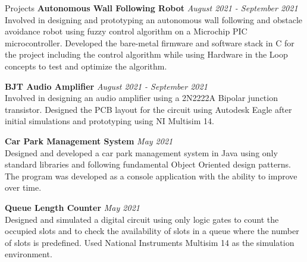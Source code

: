 \documentclass[
	11pt, %
]{./../assets/resume} %
\begin{document}
\begin{rSection}{Projects}
{\bf Autonomous Wall Following Robot} \hfill {\em August 2021 - September 2021} \\
Involved in designing and prototyping an autonomous wall following and obstacle avoidance robot using fuzzy control algorithm on a Microchip PIC microcontroller. Developed the bare-metal firmware and software stack in C for the project including the control algorithm while using Hardware in the Loop concepts to test and optimize the algorithm.
    
{\bf BJT Audio Amplifier} \hfill {\em August 2021 - September 2021} \\
Involved in designing an audio amplifier using a 2N2222A Bipolar junction transistor. Designed the PCB layout for the circuit using Autodesk Eagle after initial simulations and prototyping using NI Multisim 14.
    
{\bf Car Park Management System} \hfill {\em May 2021} \\
Designed and developed a car park management system in Java using only standard libraries and following fundamental Object Oriented design patterns. The program was developed as a console application with the ability to improve over time.

{\bf Queue Length Counter} \hfill {\em May 2021} \\
Designed and simulated a digital circuit using only logic gates to count the occupied slots 
and to check the availability of slots in a queue where the number of slots is predefined. 
Used National Instruments Multisim 14 as the simulation environment. 

\end{rSection}





\end{document}
